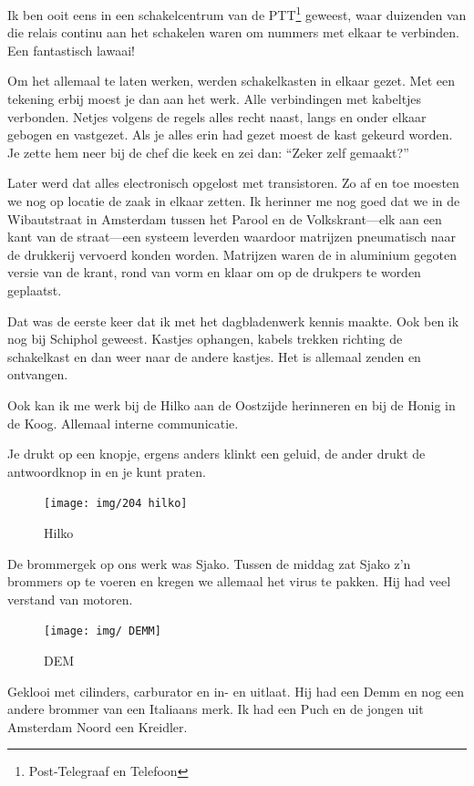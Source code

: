 \documentclass[10pt,twoside, openright]{memoir}
\begin{document}
Ik ben ooit eens in een schakelcentrum van de PTT\footnote{Post-Telegraaf en Telefoon} geweest, waar duizenden van die relais continu aan het schakelen waren om nummers met elkaar te verbinden. Een fantastisch lawaai! 

Om het allemaal te laten werken, werden schakelkasten in elkaar gezet. Met een tekening erbij moest je dan aan het werk. Alle verbindingen met kabeltjes verbonden. Netjes volgens de regels alles recht naast, langs en onder elkaar gebogen en vastgezet. Als je alles erin had gezet moest de kast gekeurd worden. Je zette hem neer bij de chef die keek en zei dan: ``Zeker zelf gemaakt?''

Later werd dat alles electronisch opgelost met transistoren. Zo af en toe moesten we nog op locatie de zaak in elkaar zetten. Ik herinner me nog goed dat we in de Wibautstraat in Amsterdam tussen het Parool en de Volkskrant---elk aan een kant van de straat---een systeem leverden waardoor matrijzen pneumatisch naar de drukkerij vervoerd konden worden. Matrijzen waren de in aluminium gegoten versie van de krant, rond van vorm en klaar om op de drukpers te worden geplaatst. 

Dat was de eerste keer dat ik met het dagbladenwerk kennis maakte. Ook ben ik nog bij Schiphol geweest. Kastjes ophangen, kabels trekken richting de schakelkast en dan weer naar de andere kastjes. Het is allemaal zenden en ontvangen. 

Ook kan ik me werk bij de Hilko aan de Oostzijde herinneren en bij de Honig in de Koog. Allemaal interne communicatie. 

Je drukt op een knopje, ergens anders klinkt een geluid, de ander drukt de antwoordknop in en je kunt praten.	

\begin{figure}
\texttt{[image: img/204 hilko]}
\caption*{\footnotesize Hilko}
\end{figure}

De brommergek op ons werk was Sjako. Tussen de middag zat Sjako z'n brommers op te voeren en kregen we allemaal het virus te pakken. Hij had veel verstand van motoren. 

\begin{figure}
\texttt{[image: img/ DEMM]}
\caption*{\footnotesize DEM}
\end{figure}

Geklooi met cilinders, carburator en in- en uitlaat. Hij had een Demm en nog een andere brommer van een Italiaans merk. Ik had een Puch en de jongen uit Amsterdam Noord een Kreidler. 
\end{document}
